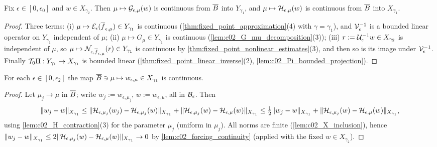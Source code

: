 \begin{lemma}
  \label{lem:c02_forcing_continuity}
  Fix $\epsilon\in[0,\epsilon_0]$ and $w\in X_{\gamma_2}$. Then $\mu\mapsto\mathcal{G}_{\epsilon,\mu}(w)$ is continuous from $\overline{B}$ into $Y_{\gamma_1}$,
  and $\mu\mapsto\mathcal{H}_{\epsilon,\mu}(w)$ is continuous from $\overline{B}$ into $X_{\gamma_1}$.
\end{lemma}
\begin{proof}
  Three terms: (i) $\mu\mapsto\mathcal{E}_\epsilon(\overline{f}_{\epsilon,\mu})\in Y_{\gamma_1}$ is continuous (\cref{thm:fixed_point_approximation}(4) with $\gamma=\gamma_1$), and
  $\mathcal{V}_\epsilon^{-1}$ is a bounded linear operator on $Y_{\gamma_1}$ independent of $\mu$; (ii) $\mu\mapsto G_\mu\in Y_{\gamma_1}$ is continuous
  (\cref{lem:c02_G_mu_decomposition}(3)); (iii) $r:=\mathcal{U}_\epsilon^{-1}w\in X_{\gamma_2}$ is independent of $\mu$, so
  $\mu\mapsto\mathcal{N}_{\epsilon,\overline{f}_{\epsilon,\mu}}(r)\in Y_{\gamma_1}$ is continuous by \cref{thm:fixed_point_nonlinear_estimates}(3), and then so is its image under
  $\mathcal{V}_\epsilon^{-1}$. Finally $\mathcal{T}_0\Pi:Y_{\gamma_1}\to X_{\gamma_1}$ is bounded linear (\cref{thm:fixed_point_linear_inverse}(2), \cref{lem:c02_Pi_bounded_projection}).
\end{proof}

\begin{lemma}
  \label{lem:c02_w_continuity}
  For each $\epsilon\in[0,\epsilon_2]$ the map $\overline{B}\ni\mu\mapsto w_{\epsilon,\mu}\in X_{\gamma_1}$ is continuous.
\end{lemma}
\begin{proof}
  Let $\mu_j\to\mu$ in $\overline{B}$; write $w_j:=w_{\epsilon,\mu_j}$, $w:=w_{\epsilon,\mu}$, all in $\mathcal{B}_\epsilon$. Then
  \[
    \|w_j-w\|_{X_{\gamma_1}}\le\|\mathcal{H}_{\epsilon,\mu_j}(w_j)-\mathcal{H}_{\epsilon,\mu_j}(w)\|_{X_{\gamma_1}}+\|\mathcal{H}_{\epsilon,\mu_j}(w)-\mathcal{H}_{\epsilon,\mu}(w)\|_{X_{\gamma_1}}
    \le\tfrac12\|w_j-w\|_{X_{\gamma_1}}+\|\mathcal{H}_{\epsilon,\mu_j}(w)-\mathcal{H}_{\epsilon,\mu}(w)\|_{X_{\gamma_1}},
  \]
  using \cref{lem:c02_H_contraction}(3) for the parameter $\mu_j$ (uniform in $\mu_j$). All norms are finite
  (\cref{lem:c02_X_inclusion}), hence $\|w_j-w\|_{X_{\gamma_1}}\le2\|\mathcal{H}_{\epsilon,\mu_j}(w)-\mathcal{H}_{\epsilon,\mu}(w)\|_{X_{\gamma_1}}\to0$ by
  \cref{lem:c02_forcing_continuity} (applied with the fixed $w\in X_{\gamma_2}$).
\end{proof}

